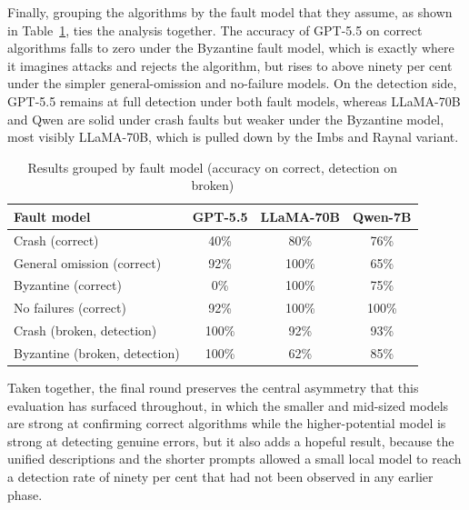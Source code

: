 Finally, grouping the algorithms by the fault model that they assume, as shown in Table~\ref{tab:final-fault}, ties the analysis together. The accuracy of GPT-5.5 on correct algorithms falls to zero under the Byzantine fault model, which is exactly where it imagines attacks and rejects the algorithm, but rises to above ninety per cent under the simpler general-omission and no-failure models. On the detection side, GPT-5.5 remains at full detection under both fault models, whereas LLaMA-70B and Qwen are solid under crash faults but weaker under the Byzantine model, most visibly LLaMA-70B, which is pulled down by the Imbs and Raynal variant.

\begin{table}[H]
\centering
\renewcommand{\arraystretch}{1.3}
\caption{Results grouped by fault model (accuracy on correct, detection on broken)}
\label{tab:final-fault}
\begin{tabular}{|l|c|c|c|}
\hline
\textbf{Fault model} & \textbf{GPT-5.5} & \textbf{LLaMA-70B} & \textbf{Qwen-7B} \\
\hline
Crash (correct) & 40\% & 80\% & 76\% \\
General omission (correct) & 92\% & 100\% & 65\% \\
Byzantine (correct) & 0\% & 100\% & 75\% \\
No failures (correct) & 92\% & 100\% & 100\% \\
\hline
Crash (broken, detection) & 100\% & 92\% & 93\% \\
Byzantine (broken, detection) & 100\% & 62\% & 85\% \\
\hline
\end{tabular}
\end{table}

Taken together, the final round preserves the central asymmetry that this evaluation has surfaced throughout, in which the smaller and mid-sized models are strong at confirming correct algorithms while the higher-potential model is strong at detecting genuine errors, but it also adds a hopeful result, because the unified descriptions and the shorter prompts allowed a small local model to reach a detection rate of ninety per cent that had not been observed in any earlier phase.
